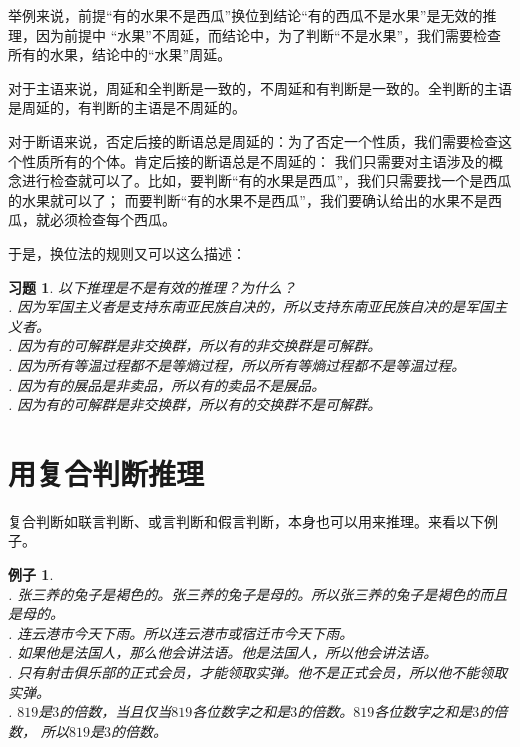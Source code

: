 \documentclass[12pt,UTF8]{ctexbook}
\newtheorem{ex}{例子}[section]
\newtheorem{xt}{习题}[section]
\begin{document}
举例来说，前提“有的水果不是西瓜”换位到结论“有的西瓜不是水果”是无效的推理，因为前提中
“水果”不周延，而结论中，为了判断“不是水果”，我们需要检查所有的水果，结论中的“水果”周延。

对于主语来说，周延和全判断是一致的，不周延和有判断是一致的。全判断的主语是周延的，有判断的主语是不周延的。

对于断语来说，否定后接的断语总是周延的：为了否定一个性质，我们需要检查这个性质所有的个体。肯定后接的断语总是不周延的：
我们只需要对主语涉及的概念进行检查就可以了。比如，要判断“有的水果是西瓜”，我们只需要找一个是西瓜的水果就可以了；
而要判断“有的水果不是西瓜”，我们要确认给出的水果不是西瓜，就必须检查每个西瓜。

于是，换位法的规则又可以这么描述：
\begin{center}
\end{center}

\begin{xt}\label{xt:2b-1-0}
    以下推理是不是有效的推理？为什么？\\
    . 因为军国主义者是支持东南亚民族自决的，所以支持东南亚民族自决的是军国主义者。 \\
    . 因为有的可解群是非交换群，所以有的非交换群是可解群。 \\
    . 因为所有等温过程都不是等熵过程，所以所有等熵过程都不是等温过程。 \\
    . 因为有的展品是非卖品，所以有的卖品不是展品。 \\
    . 因为有的可解群是非交换群，所以有的交换群不是可解群。
\end{xt}

\section{用复合判断推理}
复合判断如联言判断、或言判断和假言判断，本身也可以用来推理。来看以下例子。
\begin{ex}
    \mbox{}\\
    . 张三养的兔子是褐色的。张三养的兔子是母的。所以张三养的兔子是褐色的而且是母的。\\
    . 连云港市今天下雨。所以连云港市或宿迁市今天下雨。\\
    . 如果他是法国人，那么他会讲法语。他是法国人，所以他会讲法语。\\
    . 只有射击俱乐部的正式会员，才能领取实弹。他不是正式会员，所以他不能领取实弹。\\
    . $819$是$3$的倍数，当且仅当$819$各位数字之和是$3$的倍数。$819$各位数字之和是$3$的倍数，
    所以$819$是$3$的倍数。
\end{ex}
\end{document}
